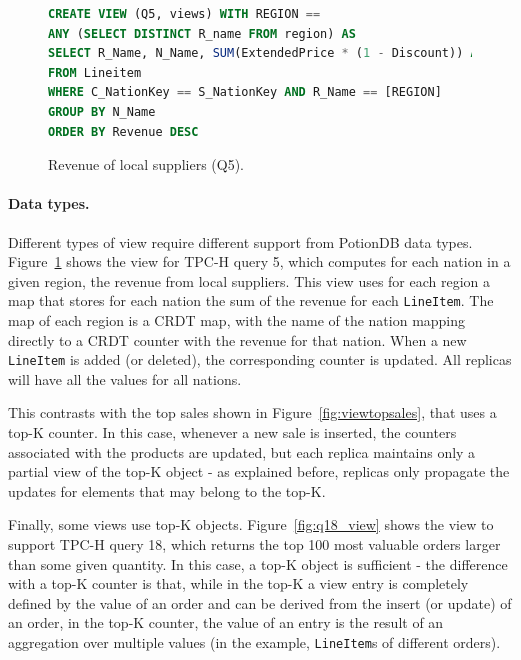 \documentclass[sigplan,twocolumn,review,anonymous]{acmart}
\begin{document}
\begin{figure}[t]
\small{
\begin{lstlisting}[language=SQL]
CREATE VIEW (Q5, views) WITH REGION == 
ANY (SELECT DISTINCT R_name FROM region) AS
SELECT R_Name, N_Name, SUM(ExtendedPrice * (1 - Discount)) AS Revenue
FROM Lineitem
WHERE C_NationKey == S_NationKey AND R_Name == [REGION]
GROUP BY N_Name
ORDER BY Revenue DESC
\end{lstlisting}}
	\vspace{-10pt}
	\caption{Revenue of local suppliers (Q5).}
	\vspace{-10pt}
	\label{fig:viewlocalsupliers}
\end{figure}


\paragraph{Data types.} Different types of view require different support from PotionDB data types.
Figure~\ref{fig:viewlocalsupliers} shows the view for TPC-H query 5, which computes
for each nation in a given region, the revenue from local suppliers. 
This view uses for each region a map that stores for each nation the sum of the 
revenue for each \texttt{LineItem}. The map of each region is a CRDT map, with the name of the nation mapping
directly to a CRDT counter with the revenue for that nation. When a new \texttt{LineItem} is added (or deleted), 
the corresponding counter is updated. All replicas will have all the values for all nations.

This contrasts with the top sales shown in Figure~\ref{fig:viewtopsales}, that uses a
top-K counter. In this case, whenever a new sale is inserted, the counters associated with the products are
updated, but each replica maintains only a partial view of the top-K object - as explained before, replicas only propagate 
the updates for elements that may belong to the top-K.

Finally, some views use top-K objects. Figure~\ref{fig:q18_view} shows the view to 
support TPC-H query 18, which returns the top 100 most valuable orders larger than 
some given quantity.  In this case, a top-K object is sufficient - the difference with a top-K counter is that,
while in the top-K a view entry is completely defined by the value of an order and can be derived 
from the insert (or update) of an order, in the top-K counter, the value of an entry is the result of an 
aggregation over multiple values (in the example, \texttt{LineItem}s of different orders).
\end{document}
